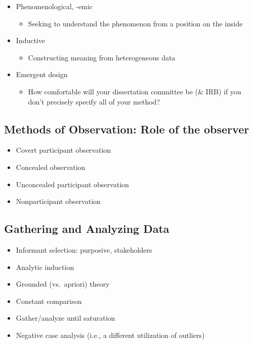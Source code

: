 \documentclass[
  english,
]{book}
\providecommand{\tightlist}{%
  \setlength{\itemsep}{0pt}\setlength{\parskip}{0pt}}
\begin{document}
\begin{itemize}
\tightlist
\item
  Phenomenological, -emic

  \begin{itemize}
  \tightlist
  \item
    Seeking to understand the phenomenon from a position on the inside
  \end{itemize}
\item
  Inductive

  \begin{itemize}
  \tightlist
  \item
    Constructing meaning from heterogeneous data
  \end{itemize}
\item
  Emergent design

  \begin{itemize}
  \tightlist
  \item
    How comfortable will your dissertation committee be (\& IRB) if you don't precisely specify all of your method?
  \end{itemize}
\end{itemize}

\hypertarget{methods-of-observation-role-of-the-observer}{%
\subsection{Methods of Observation: Role of the observer}\label{methods-of-observation-role-of-the-observer}}

\begin{itemize}
\tightlist
\item
  Covert participant observation
\item
  Concealed observation
\item
  Unconcealed participant observation
\item
  Nonparticipant observation
\end{itemize}

\hypertarget{gathering-and-analyzing-data}{%
\subsection{Gathering and Analyzing Data}\label{gathering-and-analyzing-data}}

\begin{itemize}
\tightlist
\item
  Informant selection: purposive, stakeholders
\item
  Analytic induction
\item
  Grounded (vs.~apriori) theory
\item
  Constant comparison
\item
  Gather/analyze until saturation
\item
  Negative case analysis (i.e., a different utilization of outliers)
\end{itemize}
\end{document}
